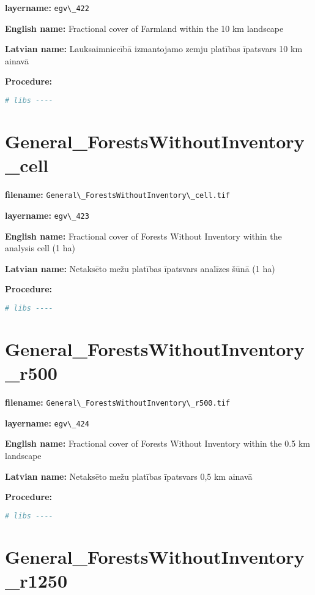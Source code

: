 \documentclass[
]{book}
\newcommand{\passthrough}[1]{#1}
\begin{document}
\textbf{layername:} \passthrough{\lstinline!egv\_422!}

\textbf{English name:} Fractional cover of Farmland within the 10 km landscape

\textbf{Latvian name:} Lauksaimniecībā izmantojamo zemju platības īpatsvars 10 km ainavā

\textbf{Procedure:}

\begin{lstlisting}[language=R]
# libs ----
\end{lstlisting}

\section{General\_ForestsWithoutInventory\_cell}\label{ch06.423}

\textbf{filename:} \passthrough{\lstinline!General\_ForestsWithoutInventory\_cell.tif!}

\textbf{layername:} \passthrough{\lstinline!egv\_423!}

\textbf{English name:} Fractional cover of Forests Without Inventory within the analysis cell (1 ha)

\textbf{Latvian name:} Netaksēto mežu platības īpatsvars analīzes šūnā (1 ha)

\textbf{Procedure:}

\begin{lstlisting}[language=R]
# libs ----
\end{lstlisting}

\section{General\_ForestsWithoutInventory\_r500}\label{ch06.424}

\textbf{filename:} \passthrough{\lstinline!General\_ForestsWithoutInventory\_r500.tif!}

\textbf{layername:} \passthrough{\lstinline!egv\_424!}

\textbf{English name:} Fractional cover of Forests Without Inventory within the 0.5 km landscape

\textbf{Latvian name:} Netaksēto mežu platības īpatsvars 0,5 km ainavā

\textbf{Procedure:}

\begin{lstlisting}[language=R]
# libs ----
\end{lstlisting}

\section{General\_ForestsWithoutInventory\_r1250}\label{ch06.425}
\end{document}

